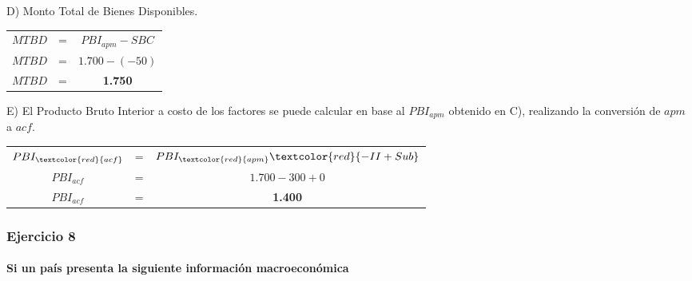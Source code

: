 \documentclass[12pt,a4paper]{article}
\newcommand{\consigna}[1]{\paragraph{\indent #1} \hspace{0pt}}
\begin{document}
        \hrulefill
        
        D) Monto Total de Bienes Disponibles.
        
		\begin{table}[H]
		\centering
        	\begin{tabular}{ c c c }
               	$ MTBD $ &=& $ PBI_{apm} - SBC $ \\
                $ MTBD $ &=& $ 1{.}700 - ( -50 ) $ \\
                $ MTBD $ &=& \textbf{1.750}
			\end{tabular}
		\end{table}
        
        \hrulefill
        
        E) El Producto Bruto Interior a costo de los factores se puede calcular en base al $PBI_{apm}$ obtenido en C), realizando la conversión de $apm$ a $acf$.
        
		\begin{table}[H]
		\centering
        	\begin{tabular}{ c c c }
               	$ PBI_{\textcolor{red}{acf}} $ &=& $ PBI_{\textcolor{red}{apm}} \textcolor{red}{ -II + Sub }$ \\
                $ PBI_{acf} $ &=& $ 1{.}700 - 300 + 0 $ \\
                $ PBI_{acf} $ &=& \textbf{1.400}
			\end{tabular}
		\end{table}
        
        
        \newpage
        
    	\subsubsection{Ejercicio 8}
        
        \consigna{Si un país presenta la siguiente información macroeconómica}
        
\end{document}
